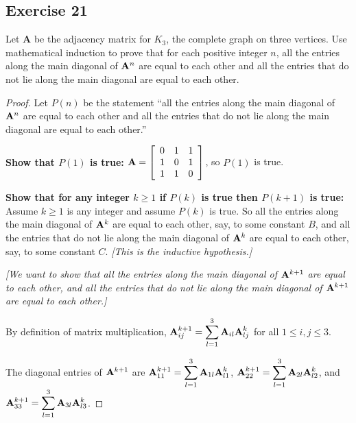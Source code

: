 \documentclass[14pt]{extarticle}
\newcommand{\dps}{\displaystyle}
\begin{document}
\subsection{Exercise 21}
Let {\bf A} be the adjacency matrix for \(K_3\), the complete graph on three vertices. Use mathematical induction to prove
that for each positive integer \(n\), all the entries along the main diagonal of \({\bf A}^n\) are equal to each other and
all the entries that do not lie along the main diagonal are equal to each other.

\begin{proof}
    Let \(P(n)\) be the statement ``all the entries along the main diagonal of \({\bf A}^n\) are equal to each other and all the
    entries that do not lie along the main diagonal are equal to each other.''

    {\bf Show that \(P(1)\) is true:}
    \({\bf A} =
    \left[
        \begin{array}{rrr}
            0 & 1 & 1 \\
            1 & 0 & 1 \\
            1 & 1 & 0 \\
        \end{array}
        \right]
    \), so \(P(1)\) is true.

        {\bf Show that for any integer \(k \geq 1\) if \(P(k)\) is true then \(P(k+1)\) is true:} Assume \(k \geq 1\) is any
    integer and assume \(P(k)\) is true. So all the entries along the main diagonal of \({\bf A}^k\) are equal to each other,
    say, to some constant \(B\), and all the entries that do not lie along the main diagonal of  \({\bf A}^k\) are equal to
    each other, say, to some constant \(C\). {\it [This is the inductive hypothesis.]}

        {\it [We want to show that all the entries along the main diagonal of \({\bf A}^{k+1}\) are equal to each other, and
                all the entries that do not lie along the main diagonal of \({\bf A}^{k+1}\) are equal to each other.]}

    By definition of matrix multiplication, \(\dps {\bf A}^{k+1}_{ij} = \sum_{l=1}^{3} {\bf A}_{il} {\bf A}^k_{lj}\) for all
    \(1 \leq i, j \leq 3\).

    The diagonal entries of \({\bf A}^{k+1}\) are \(\dps {\bf A}^{k+1}_{11} = \sum_{l=1}^{3} {\bf A}_{1l} {\bf A}^k_{l1}\),
    \(\dps {\bf A}^{k+1}_{22} = \sum_{l=1}^{3} {\bf A}_{2l} {\bf A}^k_{l2}\), and \\ \(\dps {\bf A}^{k+1}_{33} = \sum_{l=1}^{3}
    {\bf A}_{3l} {\bf A}^k_{l3}\).


\end{proof}
\end{document}
